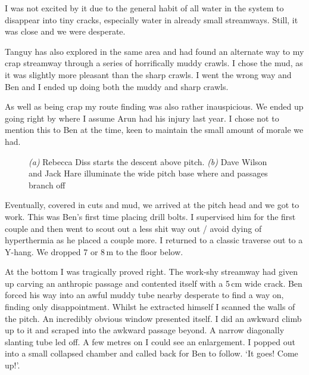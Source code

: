 I was not excited by it due to the general habit of all water in the system to disappear into tiny cracks, especially water in already small streamways. Still, it was close and we were desperate.
 
Tanguy has also explored in the same area and had found an alternate way to my crap streamway through a series of horrifically muddy crawls. I chose the mud, as it was slightly more pleasant than the sharp crawls. I went the wrong way and Ben and I ended up doing both the muddy and sharp crawls.
 
As well as being crap my route finding was also rather inauspicious. We ended up going right by where I assume Arun had his injury last year. I chose not to mention this to Ben at the time, keen to maintain the small amount of morale we had.

 \begin{figure}[t!]
\checkoddpage \ifoddpage \forcerectofloat \else \forceversofloat \fi
\centering
\begin{subfigure}[t]{0.685\textwidth}
\centering
{}
 \caption{}\label{water hallelujah}
\end{subfigure}
    \hfill
    \begin{subfigure}[t]{0.305\textwidth}
        \centering
        \caption{} \label{Diss and Dave}
    \end{subfigure}
    \caption{
    \emph{(a)} Rebecca Diss starts the descent above  pitch.
    \emph{(b)} Dave Wilson and Jack Hare illuminate the wide pitch base where  and  passages branch off }
\end{figure}
 
Eventually, covered in cuts and mud, we arrived at the pitch head and we got to work. This was Ben's first time placing drill bolts. I supervised him for the first couple and then went to scout out a less shit way out / avoid dying of hyperthermia as he placed a couple more. I returned to a classic traverse out to a Y-hang. We dropped 7 or 8\,m to the floor below.
 
At the bottom I was tragically proved right. The work-shy streamway had given up carving an anthropic passage and contented itself with a 5\,cm wide crack. Ben forced his way into an awful muddy tube nearby desperate to find a way on, finding only disappointment. Whilst he extracted himself I scanned the walls of the pitch. An incredibly obvious window presented itself. I did an awkward climb up to it and scraped into the awkward passage beyond. A narrow diagonally slanting tube led off. A few metres on I could see an enlargement. I popped out into a small collapsed chamber and called back for Ben to follow. `It goes! Come up!'. 

